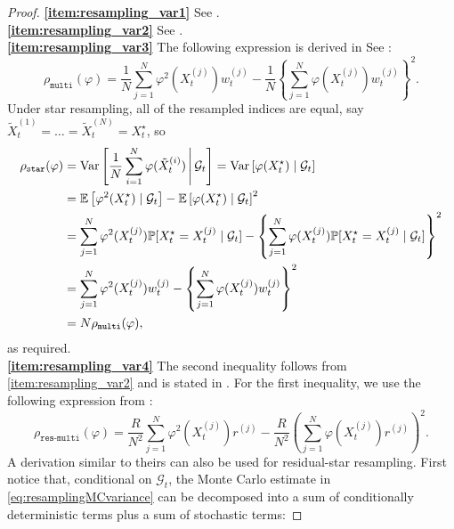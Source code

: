 \begin{proof}
\textbf{\ref{item:resampling_var1}} See \textcite[Section 3]{douc2005}.\\
\textbf{\ref{item:resampling_var2}} See \textcite[Section 3]{douc2005}.\\
\textbf{\ref{item:resampling_var3}}
The following expression is derived in See \textcite[Section 3]{douc2005}:
\begin{equation*}
\rho_{\texttt{multi}}(\varphi)
= \frac{1}{N} \sum_{j=1}^N \varphi^2(X_t^{(j)}) w_t^{(j)}
        - \frac{1}{N} \left\{ \sum_{j=1}^N \varphi(X_t^{(j)}) w_t^{(j)} \right\}^2 .
\end{equation*}
Under star resampling, all of the resampled indices are equal, say $\tilde{X}_t^{(1)} = \dots = \tilde{X}_t^{(N)} = X_t^\star$, so
\begin{align*}
\rho_{\texttt{star}}(\varphi)
&= \operatorname{Var}\left[ \frac{1}{N} \sum_{i=1}^N \varphi(\tilde{X}_t^{(i)}) \,\middle|\, \mathcal{G}_t \right]
= \operatorname{Var}\left[ \varphi( X_t^\star) \mid \mathcal{G}_t \right] \\
&= \mathbb{E}\left[ \varphi^2( X_t^\star) \mid \mathcal{G}_t \right]
        - \mathbb{E}\left[ \varphi( X_t^\star) \mid \mathcal{G}_t \right]^2 \\
&= \sum_{j=1}^N \varphi^2(X_t^{(j)}) 
        \mathbb{P}[ X_t^\star = X_t^{(j)} \mid \mathcal{G}_t ]
        - \left\{ \sum_{j=1}^N \varphi(X_t^{(j)}) 
        \mathbb{P}[ X_t^\star = X_t^{(j)} \mid \mathcal{G}_t ] \right\}^2 \\
&= \sum_{j=1}^N \varphi^2(X_t^{(j)}) w_t^{(j)}
        - \left\{ \sum_{j=1}^N \varphi(X_t^{(j)}) w_t^{(j)} \right\}^2 \\
&= N \rho_{\texttt{multi}}(\varphi) ,
\end{align*}
as required.\\
\textbf{\ref{item:resampling_var4}} The second inequality follows from \ref{item:resampling_var2} and is stated in \textcite[p.9]{gerber2017}.
For the first inequality, we use the following expression from \textcite[Section 3]{douc2005}:
\begin{equation*}
\rho_{\texttt{res-multi}}(\varphi)
= \frac{R}{N^2} \sum_{j=1}^N \varphi^2(X_t^{(j)}) r^{(j)}
        - \frac{R}{N^2} \left( \sum_{j=1}^N \varphi(X_t^{(j)}) r^{(j)} \right)^2 .
\end{equation*}
A derivation similar to theirs can also be used for residual-star resampling. 
First notice that, conditional on $\mathcal{G}_t$, the Monte Carlo estimate in \eqref{eq:resamplingMCvariance} can be decomposed into a sum of conditionally deterministic terms plus a sum of stochastic terms:

\end{proof}
